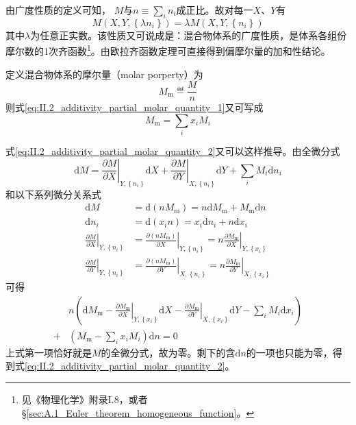 \documentclass[main.tex]{subfiles}
\begin{document}
由广度性质的定义可知， $M$与$n\equiv\sum_in_i$成正比。故对每一$X$、$Y$有
\[M\left(X,Y,\left\{\lambda n_i\right\}\right)=\lambda M\left(X,Y,\left\{n_i\right\}\right)\]
其中$\lambda$为任意正实数。该性质又可说成是：混合物体系的广度性质，是体系各组份摩尔数的1次齐函数\footnote{见《物理化学》附录I.8，或者\S\ref{sec:A.1_Euler_theorem_homogeneous_function}。}。由欧拉齐函数定理可直接得到偏摩尔量的加和性结论。

定义混合物体系的摩尔量（molar porperty）为
\[M_\text{m}\eqdef \frac{M}{n}\]
则式\eqref{eq:II.2_additivity_partial_molar_quantity_1}又可写成
\begin{equation}\label{eq:II.2_additivity_partial_molar_quantity_2}
    M_\text{m}=\sum_ix_iM_i
\end{equation}

式\eqref{eq:II.2_additivity_partial_molar_quantity_2}又可以这样推导。由全微分式
\[\mathrm{d}M=\left.\frac{\partial M}{\partial X}\right|_{Y,\left\{n_i\right\}}\mathrm{d}X+\left.\frac{\partial M}{\partial Y}\right|_{X,\left\{n_i\right\}}\mathrm{d}Y+\sum_i M_i\mathrm{d}n_i\]
和以下系列微分关系式
\begin{align*}
    \mathrm{d}M                                                       & =\mathrm{d}\left(nM_\text{m}\right)=n\mathrm{d}M_\text{m}+M_\text{m}\mathrm{d}n                                                                                       \\
    \mathrm{d}n_i                                                     & =\mathrm{d}\left(x_i n\right)=x_i\mathrm{d}n_i+n\mathrm{d}x_i                                                                                                         \\
    \left.\frac{\partial M}{\partial X}\right|_{Y,\left\{n_i\right\}} & =\left.\frac{\partial \left(nM_\text{m}\right)}{\partial X}\right|_{Y,\left\{n_i\right\}}=n\left.\frac{\partial M_\text{m}}{\partial X}\right|_{Y,\left\{x_i\right\}} \\
    \left.\frac{\partial M}{\partial Y}\right|_{Y,\left\{n_i\right\}} & =\left.\frac{\partial\left(nM_\text{m}\right)}{\partial Y}\right|_{X,\left\{n_i\right\}}=n\left.\frac{\partial M_\text{m}}{\partial Y}\right|_{X,\left\{x_i\right\}}
\end{align*}
可得
\begin{align*}
      & n\left(\mathrm{d}M_\text{m}-\left.\frac{\partial M_\text{m}}{\partial X}\right|_{Y,\left\{x_i\right\}}\mathrm{d}X-\left.\frac{\partial M_\text{m}}{\partial Y}\right|_{X,\left\{x_i\right\}}\mathrm{d}Y-\sum_iM_i\mathrm{d}x_i\right) \\
    + & \left(M_\text{m}-\sum_ix_iM_i\right)\mathrm{d}n=0
\end{align*}
上式第一项恰好就是$M$的全微分式，故为零。剩下的含$\mathrm{d}n$的一项也只能为零，得到式\eqref{eq:II.2_additivity_partial_molar_quantity_2}。
\end{document}
